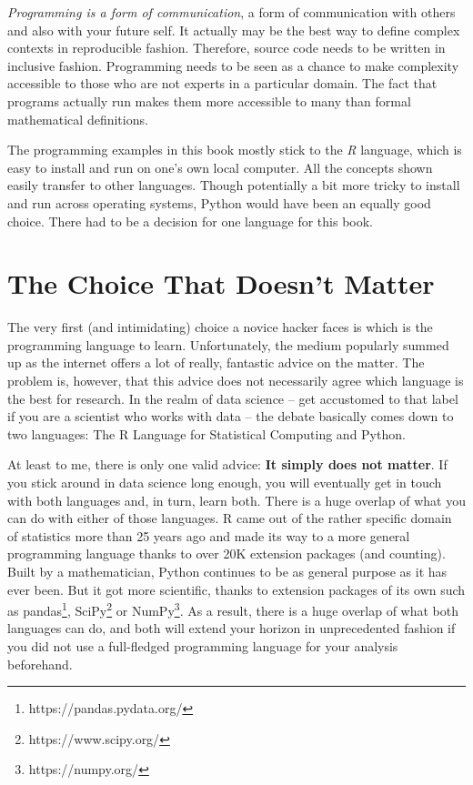 \documentclass[
  12pt,
  letterpaper,
]{krantz}
\begin{document}
\emph{Programming is a form of communication}, a form of communication
with others and also with your future self. It actually may be the best
way to define complex contexts in reproducible fashion. Therefore,
source code needs to be written in inclusive fashion. Programming needs
to be seen as a chance to make complexity accessible to those who are
not experts in a particular domain. The fact that programs actually run
makes them more accessible to many than formal mathematical definitions.

The programming examples in this book mostly stick to the \emph{R}
language, which is easy to install and run on one's own local computer.
All the concepts shown easily transfer to other languages. Though
potentially a bit more tricky to install and run across operating
systems, Python would have been an equally good choice.
There had to be a decision for one language for this book.

\hypertarget{the-choice-that-doesnt-matter}{%
\section{The Choice That Doesn't
Matter}\label{the-choice-that-doesnt-matter}}

The very first (and intimidating) choice a novice hacker faces is which
is the programming language to learn. Unfortunately, the medium
popularly summed up as the internet offers a lot of really, fantastic
advice on the matter. The problem is, however, that this advice does not
necessarily agree which language is the best for research. In the realm
of data science -- get accustomed to that label if you are a scientist
who works with data -- the debate basically comes down to two languages:
The R Language for Statistical Computing and Python.

At least to me, there is only one valid advice: \textbf{It simply does
not matter}. If you stick around in data science long enough, you will
eventually get in touch with both languages and, in turn, learn both.
There is a huge overlap of what you can do with either of those
languages. R came out of the rather specific domain of statistics more
than 25 years ago and made its way to a more general programming
language thanks to over 20K extension packages (and counting). Built by
a mathematician, Python continues to be as general purpose
as it has ever been. But it got more scientific, thanks to extension
packages of its own such as pandas\footnote{https://pandas.pydata.org/},
SciPy\footnote{https://www.scipy.org/} or NumPy\footnote{https://numpy.org/}.
As a result, there is a huge overlap of what both languages can do, and
both will extend your horizon in unprecedented fashion if you did not
use a full-fledged programming language for your analysis beforehand.
\end{document}
